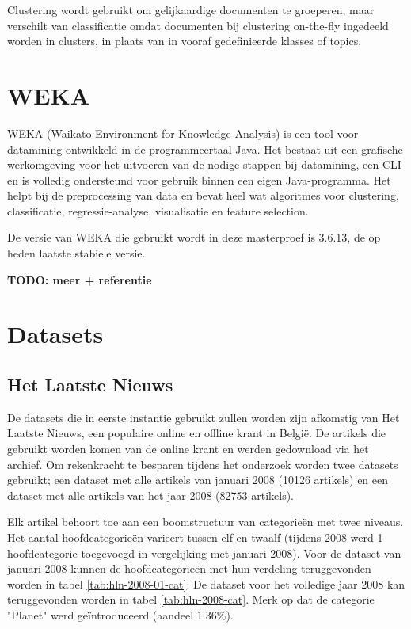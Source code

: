 Clustering wordt gebruikt om gelijkaardige documenten te groeperen, maar verschilt van classificatie omdat documenten bij clustering on-the-fly ingedeeld worden in clusters, in plaats van in vooraf gedefinieerde klasses of topics.

\section{WEKA}
WEKA (Waikato Environment for Knowledge Analysis) is een tool voor datamining ontwikkeld in de programmeertaal Java. Het bestaat uit een grafische werkomgeving  voor het uitvoeren van de nodige stappen bij datamining, een CLI en is volledig ondersteund voor gebruik binnen een eigen Java-programma. Het helpt bij de preprocessing van data en bevat heel wat algoritmes voor clustering, classificatie, regressie-analyse, visualisatie en feature selection.

De versie van WEKA die gebruikt wordt in deze masterproef is 3.6.13, de op heden laatste stabiele versie.

\textbf{TODO: meer + referentie}

\section{Datasets}
\subsection{Het Laatste Nieuws}
De datasets die in eerste instantie gebruikt zullen worden zijn afkomstig van Het Laatste Nieuws, een populaire online en offline krant in Belgi\"e. De artikels die gebruikt worden komen van de online krant en werden gedownload via het archief. Om rekenkracht te besparen tijdens het onderzoek worden twee datasets gebruikt; een dataset met alle artikels van januari 2008 (10126 artikels) en een dataset met alle artikels van het jaar 2008 (82753 artikels).

Elk artikel behoort toe aan een boomstructuur van categorie\"en met twee niveaus. Het aantal hoofdcategorie\"en varieert tussen elf en twaalf (tijdens 2008 werd 1 hoofdcategorie toegevoegd in vergelijking met januari 2008). Voor de dataset van januari 2008 kunnen de hoofdcategorie\"en met hun verdeling teruggevonden worden in tabel \ref{tab:hln-2008-01-cat}. De dataset voor het volledige jaar 2008 kan teruggevonden worden in tabel \ref{tab:hln-2008-cat}. Merk op dat de categorie "Planet" werd ge\"introduceerd (aandeel 1.36\%).


